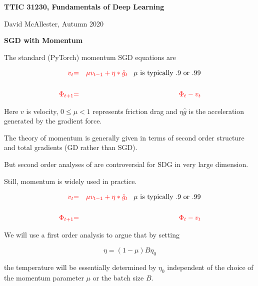 


\newcommand{\solution}[1]{\bigskip {\bf Solution}: #1}



{\Huge
  \centerline{\bf TTIC 31230, Fundamentals of Deep Learning}
  \bigskip
  \centerline{David McAllester, Autumn 2020}
  \vfill
  \centerline{\bf SGD with Momentum}
  \vfill
  \vfill


The standard (PyTorch) momentum SGD equations are

\begin{eqnarray*}
  {\color{red} v_t} & {\color{red} =} & {\color{red} \mu v_{t-1} + \eta * \hat{g}_t} \;\;\;\mbox{$\mu$ is typically .9 or .99}\\
  \\
  {\color{red} \Phi_{t+1}} & {\color{red} =} & {\color{red} \Phi_t -  v_t} \\
\end{eqnarray*}

\vfill
Here $v$ is velocity, $0 \leq \mu < 1$ represents friction drag and $\eta \hat{g}$ is the acceleration generated by the gradient force.


The theory of momentum is generally given in terms of second order structure and total gradients (GD rather than SGD).

\vfill
But second order analyses of are controversial for SDG in very large dimension.

\vfill
Still, momentum is widely used in practice.


\begin{eqnarray*}
  {\color{red} v_t} & {\color{red} =} & {\color{red} \mu v_{t-1} + \eta * \hat{g}_t} \;\;\;\mbox{$\mu$ is typically .9 or .99}\\
  \\
  {\color{red} \Phi_{t+1}} & {\color{red} =} & {\color{red} \Phi_t -  v_t} \\
\end{eqnarray*}

\vfill
We will use a first order analysis to argue that by setting

{\color{red} $$\eta = (1-\mu)B\eta_0$$}

\vfill
the temperature will be essentially determined by $\eta_0$ independent of the choice of the momentum parameter $\mu$ or the batch size $B$.

}
